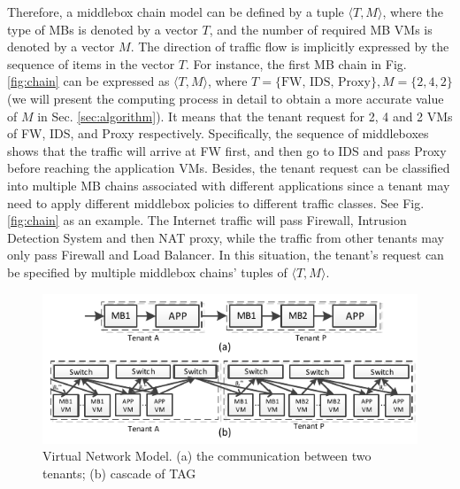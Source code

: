\documentclass[review]{elsarticle}
\begin{document}

Therefore, a middlebox chain model can be defined by a tuple $\langle T, M \rangle$, where the type of MBs is denoted by a vector $T$, and the number of required MB VMs is denoted by a vector $M$. The direction of traffic flow is implicitly expressed by the sequence of items in the vector $T$. For instance, the first MB chain in Fig. \ref{fig:chain} can be expressed as $\langle T, M \rangle$, where $T=\{\text{FW, IDS, Proxy}\}, M=\{2, 4, 2\}$ (we will present the computing process in detail to obtain a more accurate value of $M$ in Sec. \ref{sec:algorithm}). It means that the tenant request for 2, 4 and 2 VMs of FW, IDS, and Proxy respectively. Specifically, the sequence of middleboxes shows that the traffic will arrive at FW first, and then go to IDS and pass Proxy before reaching the application VMs. Besides, the tenant request can be classified into multiple MB chains associated with different applications \cite{stratos12, M14sap, nfv_challenges} since a tenant may need to apply different middlebox policies to different traffic classes. See Fig. \ref{fig:chain} as an example. The Internet traffic will pass Firewall, Intrusion Detection System and then NAT proxy, while the traffic from other tenants may only pass Firewall and Load Balancer. In this situation, the tenant's request can be specified by multiple middlebox chains' tuples of $\langle T, M \rangle$.
\begin{figure}
	\centering
	\includegraphics[width=4.5 in]{fig/abstraction.pdf}
	\caption{Virtual Network Model. (a) the communication between two tenants; (b) cascade of TAG}
	\label{fig:abstraction}
\end{figure}
\end{document}
